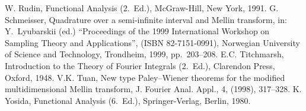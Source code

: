 \documentclass[amsmath,english,a4paper,graphicx,12pt]{article}
\begin{document}
\begin{thebibliography}{99}
 W. Rudin, Functional Analysis (2.~Ed.), McGraw-Hill, New York, 1991.
 G. Schmeisser, Quadrature over a semi-infinite interval and Mellin transform, in: Y.~Lyubarskii (ed.) ``Proceedings of the
1999 International Workshop on Sampling Theory and Applications'', 
(ISBN 82-7151-0991), Norwegian University of 
Science and Technology, Trondheim, 1999, pp.~203--208.
 E.C. Titchmarsh, Introduction to the Theory of Fourier Integrals (2.~Ed.), Clarendon Press, Oxford, 1948.
 V.K. Tuan, New type Paley--Wiener theorems for the modified multidimensional Mellin transform, J. Fourier Anal. Appl., 4, (1998), 317--328.
 K. Yosida, Functional Analysis (6.~Ed.), Springer-Verlag, Berlin, 1980.


\end{thebibliography}
\end{document}
